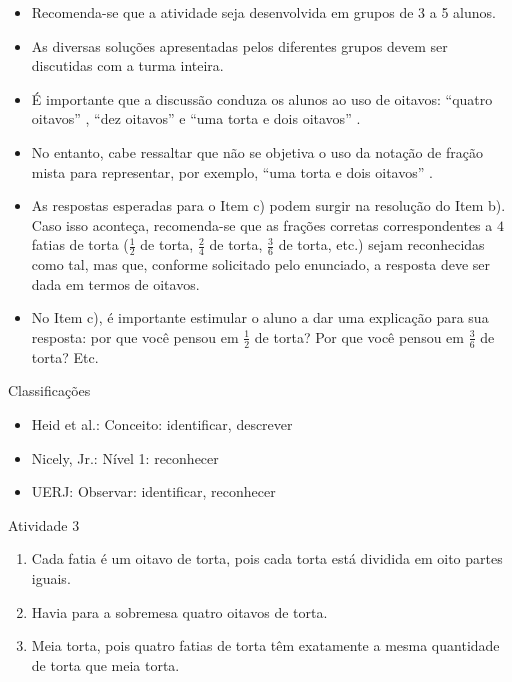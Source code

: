 \documentclass[oneside]{book}
\begin{document}
\begin{multicols}{2}
\begin{itemize} %
    \item       Recomenda-se que a atividade seja desenvolvida em grupos de 3 a 5 alunos.
    \item       As diversas soluções apresentadas pelos diferentes grupos devem ser discutidas com a turma inteira.
    \item       É importante que a discussão conduza os alunos ao uso de oitavos:       ``quatro oitavos''      ,       ``dez oitavos''       e       ``uma torta e dois oitavos''      .
    \item       No entanto, cabe ressaltar que não se objetiva o uso da notação de fração mista para representar, por exemplo,       ``uma torta e dois oitavos''      .
    \item       As respostas esperadas para o Item c) podem surgir na resolução do Item b). Caso isso aconteça, recomenda-se que as frações corretas correspondentes a       $4$       fatias de torta ($\frac{1}{2}$       de torta,       $\frac{2}{4}$       de torta,       $\frac{3}{6}$       de torta, etc.) sejam reconhecidas como tal, mas que, conforme solicitado pelo enunciado, a resposta deve ser dada em termos de oitavos.
    \item       No Item c), é importante estimular o aluno a dar uma explicação para sua resposta: por que você pensou em       $\frac{1}{2}$       de torta? Por que você pensou em       $\frac{3}{6}$       de torta? Etc.
\end{itemize} %


  Classificações
\begin{itemize} %
    \item       Heid et al.: Conceito: identificar, descrever
    \item       Nicely, Jr.: Nível 1: reconhecer
    \item       UERJ: Observar: identificar, reconhecer
\end{itemize} %




\begin{resposta*}{Atividade 3}
\begin{enumerate} [\quad a)] %
    \item       Cada fatia é um oitavo de torta, pois cada torta está dividida em oito partes iguais.
    \item       Havia para a sobremesa quatro oitavos de torta.
    \item       Meia torta, pois quatro fatias de torta têm exatamente a mesma quantidade de torta que meia torta.
\end{enumerate} %
  

\end{resposta*}
\end{multicols}
\end{document}
